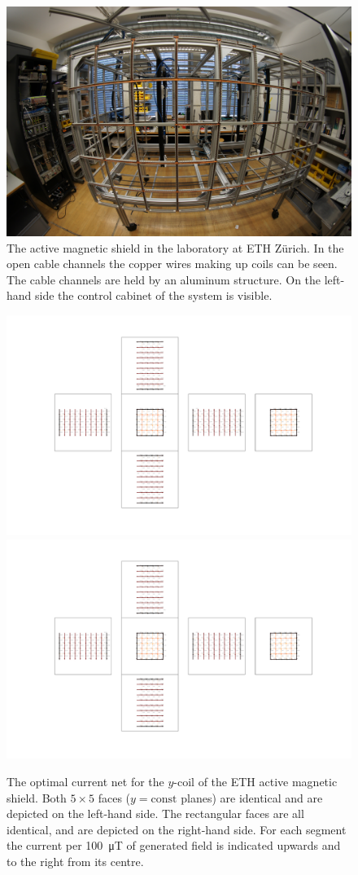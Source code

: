 \begin{figure}
  \centering
  \includegraphics[width=0.75\linewidth]{gfx/prototype/DSC03472.JPG}
  \caption{The active magnetic shield in the laboratory at ETH Zürich. In the open cable channels the copper wires making up coils can be seen. The cable channels are held by an aluminum structure. On the left-hand side the control cabinet of the system is visible.}\label{fig:prototype_photo}
\end{figure}

\begin{figure}
  \centering
  \includegraphics[height=0.3\linewidth]{gfx/prototype/coil_design_y_100uT_1.pdf}
  \quad\quad
  \includegraphics[height=0.3\linewidth]{gfx/prototype/coil_design_y_100uT_2.pdf}
  \caption{The optimal current net for the $y$-coil of the ETH active magnetic shield. Both $5 \times 5$ faces ($y = \mathrm{const}$ planes) are identical and are depicted on the left-hand side. The rectangular faces are all identical, and are depicted on the right-hand side. For each segment the current per \SI{100}{\micro\tesla} of generated field is indicated upwards and to the right from its centre.}\label{fig:prototype_coil_y_currents}
\end{figure}

